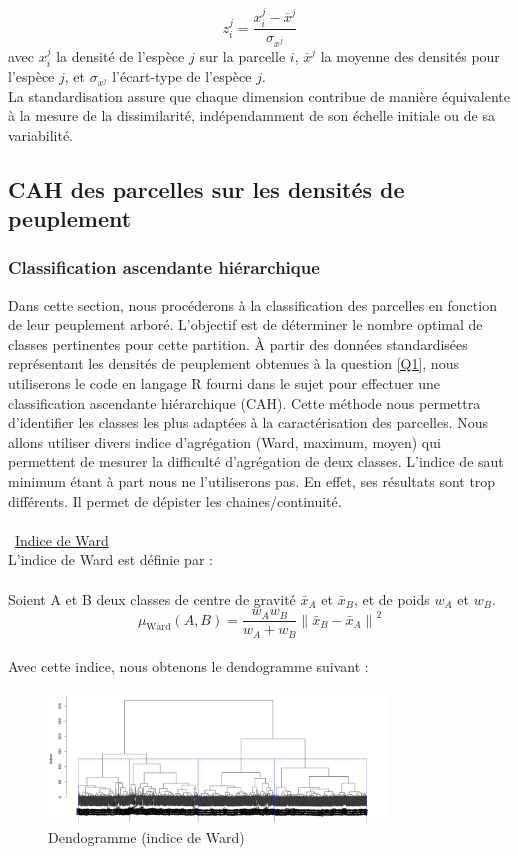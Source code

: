 \documentclass{article}
\begin{document}
\[
z_i^j = \frac{x_i^j - \overline{x}^j}{\sigma_{x^j}}
\]
avec \( x_i^j \) la densité de l’espèce \( j \) sur la parcelle \( i \), \( \overline{x}^j \) la moyenne des densités pour l’espèce \( j \), et \( \sigma_{x^j} \) l’écart-type de l’espèce \( j \).\\
La standardisation assure que chaque dimension contribue de manière équivalente à la mesure de la dissimilarité, indépendamment de son échelle initiale ou de sa variabilité.
\subsection{CAH des parcelles sur les densités de peuplement}
\subsubsection{Classification ascendante hiérarchique}
Dans cette section, nous procéderons à la classification des parcelles en fonction de leur peuplement arboré. L'objectif est de déterminer le nombre optimal de classes pertinentes pour cette partition. À partir des données standardisées représentant les densités de peuplement obtenues à la question \ref{Q1}, nous utiliserons le code en langage R fourni dans le sujet pour effectuer une classification ascendante hiérarchique (CAH). Cette méthode nous permettra d’identifier les classes les plus adaptées à la caractérisation des parcelles.
Nous allons utiliser divers indice d'agrégation (Ward, maximum, moyen) qui permettent de mesurer la difficulté d'agrégation de deux classes.
L'indice de saut minimum étant à part nous ne l'utiliserons pas. En effet, ses résultats sont trop différents. Il permet de dépister les chaines/continuité.
\\
\\
\textbullet\ \underline{Indice de Ward}
\\
L'indice de Ward est définie par :
\\
\\
Soient A et B deux classes de centre de gravité $\bar{x}_A$ et $\bar{x}_B$, et de poids $w_A$ et $w_B$.
\[
\mu_\text{Ward} (A,B) = \frac{w_A w_B}{w_A + w_B} \left\lVert \bar{x}_B - \bar{x}_A \right\lVert ^2
\]
\\
Avec cette indice, nous obtenons le dendogramme suivant :
\begin{figure}[h]
    \centering
    \includegraphics[width=0.8\textwidth]{wardC.png}
    \caption{Dendogramme (indice de Ward)}
    \label{fig:Ward} 
\end{figure}
\end{document}
